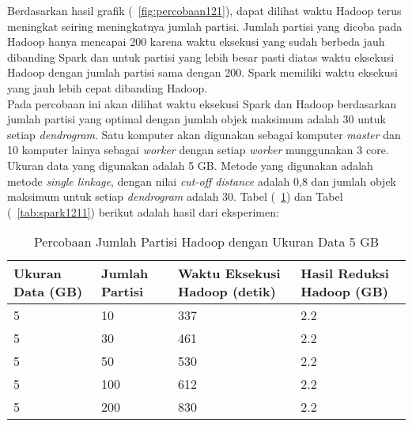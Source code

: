 Berdasarkan hasil grafik (~\ref{fig:percobaan121}), dapat dilihat waktu Hadoop terus meningkat seiring meningkatnya jumlah partisi. Jumlah partisi yang dicoba pada Hadoop hanya mencapai 200 karena waktu eksekusi yang sudah berbeda jauh dibanding Spark dan untuk partisi yang lebih besar pasti diatas waktu eksekusi Hadoop dengan jumlah partisi sama dengan 200. Spark memiliki waktu eksekusi yang jauh lebih cepat dibanding Hadoop. \\













Pada percobaan ini akan dilihat waktu eksekusi Spark dan Hadoop berdasarkan jumlah partisi yang optimal dengan jumlah objek maksimum adalah 30 untuk setiap \textit{dendrogram}. Satu komputer akan digunakan sebagai komputer \textit{master} dan 10 komputer lainya sebagai \textit{worker} dengan setiap \textit{worker} munggunakan 3 core. Ukuran data yang digunakan adalah 5 GB. Metode yang digunakan adalah metode \textit{single linkage}, dengan nilai \textit{cut-off distance} adalah 0,8 dan jumlah objek maksimum untuk setiap \textit{dendrogram} adalah 30. Tabel (~\ref{tab:spark1111}) dan Tabel (~\ref{tab:spark1211}) berikut adalah hasil dari eksperimen:





\begin{table}[H] 
	\centering 
	\caption{Percobaan Jumlah Partisi Hadoop dengan Ukuran Data 5 GB}
	\label{tab:spark1111}
	\begin{tabular}{|p{3cm}|p{3cm}|p{4cm}|p{4cm}|}
\hline
Ukuran Data (GB) & Jumlah Partisi &  Waktu Eksekusi Hadoop (detik) & Hasil Reduksi Hadoop (GB)\\
\hline
5 & 10 & 337  & 2.2  \\
\hline
5 & 30 & 461  & 2.2  \\
\hline
5 & 50 & 530  & 2.2   \\
\hline
5 & 100 & 612 & 2.2   \\
\hline
5 & 200 & 830 & 2.2   \\
\hline


\hline

	\end{tabular} 
\end{table}






